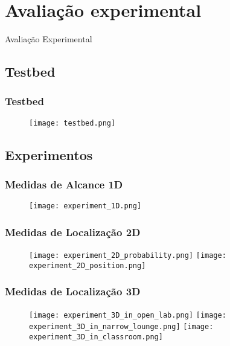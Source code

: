 \section{Avaliação experimental}

\begin{frame}
  \begin{center}
    \Huge Avaliação Experimental
		\end{center}
\end{frame}

\subsection{Testbed}

\begin{frame}
  \frametitle{Testbed}

  \begin{figure}
  		\texttt{[image: testbed.png]}
  \end{figure}
\end{frame}

\subsection{Experimentos}

\begin{frame}
  \frametitle{Medidas de Alcance 1D}

  \begin{figure}
  		\texttt{[image: experiment\_1D.png]}
  \end{figure}
\end{frame}

\begin{frame}
  \frametitle{Medidas de Localização 2D}

  \begin{figure}
  		\texttt{[image: experiment\_2D\_probability.png]}
  		\texttt{[image: experiment\_2D\_position.png]}
  \end{figure}
\end{frame}

\begin{frame}
  \frametitle{Medidas de Localização 3D}

  \begin{figure}
    \texttt{[image: experiment\_3D\_in\_open\_lab.png]}\hfil
    \texttt{[image: experiment\_3D\_in\_narrow\_lounge.png]}\newline
    \hfil\hfil\texttt{[image: experiment\_3D\_in\_classroom.png]}
		\end{figure}
\end{frame}


